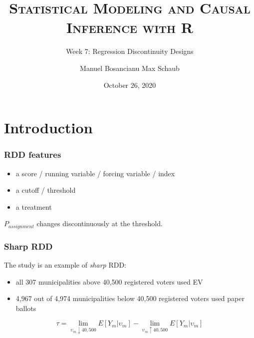 \documentclass[12pt,english,dvipsnames,aspectratio=169,handout]{beamer}\usepackage[]{graphicx}\usepackage[]{xcolor}
\title{\textsc{Statistical Modeling and Causal Inference with R}}
\subtitle{Week 7: Regression Discontinuity Designs}
\date{October 26, 2020}
\author{Manuel Bosancianu \hfill Max Schaub}
\institute{Hertie School of Governance}
\begin{document}
\maketitle




\section{Introduction}

\begin{frame}
\frametitle{RDD features}

\begin{itemize}
\item a score / running variable / forcing variable / index
\item a cutoff / threshold
\item a treatment
\end{itemize}
\pause
\bigskip

$P_{assignment}$ changes discontinuously at the threshold.

\end{frame}


\begin{frame}
\frametitle{Sharp RDD}
The  study is an example of \textit{sharp} RDD:

\begin{itemize}
  \item all 307 municipalities above 40,500 registered voters used EV
  \item 4,967 out of 4,974 municipalities below 40,500 registered voters used paper ballots
\end{itemize}
\pause
\bigskip

\begin{equation}
  \tau = \lim_{\upsilon_m \downarrow 40,500}E[Y_m | \upsilon_m] - \lim_{\upsilon_m \uparrow 40,500}E[Y_m | \upsilon_m]
  \label{eq:01}
\end{equation}


\end{frame}
\end{document}
